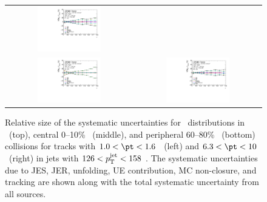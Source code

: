 \begin{figure}
{\begin{tabular}{cc}
\includegraphics[width=0.53\textwidth]{figures/systematics/ChPS_dR_sys_PbPb_error_trk6_jet7_cent0} \\
\includegraphics[width=0.53\textwidth]{figures/systematics/ChPS_dR_sys_PbPb_error_trk2_jet7_cent5} &
\includegraphics[width=0.53\textwidth]{figures/systematics/ChPS_dR_sys_PbPb_error_trk6_jet7_cent5} \\
\end{tabular}}
\caption{
Relative size of the systematic uncertainties for \Dptr\ distributions in \pp\ (top), central 0--10\% \pbpb\ (middle), and peripheral 60--80\% \pbpb\ (bottom) collisions for tracks with $1.0 < \pt < 1.6$ \GeV\ (left) and $6.3 < \pt < 10$ \GeV\ (right) in jets with $126 < \mbox{$p_{\mathrm{T}}^{\mathrm{jet}}$} < 158$ \GeV. The systematic uncertainties due to JES, JER, unfolding, UE contribution, MC non-closure, and tracking are shown along with the total systematic uncertainty from all sources.
}
\label{fig:Systematics_Dpt}
\end{figure}

